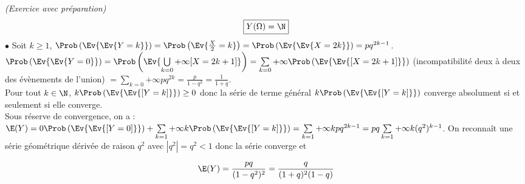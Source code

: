 \documentclass[11pt]{article}%
\begin{document}
\begin{exercice}{\it (Exercice avec préparation)}
\[
 \boxed{Y(\Omega) = \N}
\]
$\bullet$ Soit $k \geq 1$, $\Prob\left(\Ev{\Ev{Y = k}}\right) =
\Prob\left(\Ev{ \frac{X}{2} = k}\right) = \Prob\left(\Ev{\Ev{X =
      2k}}\right) = p q^{2k-1}$.\\
$\Prob\left(\Ev{\Ev{Y = 0}}\right) = \Prob\left(\Ev{ \bigcup
    \limits_{k = 0}{+ \infty} [X = 2k + 1]}\right) = \sum \limits_{k =
  0}{+ \infty} \Prob\left(\Ev{\Ev{[X = 2k + 1]}}\right) $
(incompatibilité deux à deux des évènements de l'union) $ = \sum
\limits_{k = 0}{+
  \infty}pq^{2k} = \frac{p}{1-q^{2}} = \frac{1}{1 + q}$. \\
Pour tout $k \in \N$, $k\Prob\left(\Ev{\Ev{[Y = k]}}\right) \geq 0$
donc la série de terme général $k \Prob\left(\Ev{\Ev{[Y = k]}}\right)$
converge absolument si et seulement si elle converge. \\
Sous réserve de convergence, on a : \\
$\E(Y) = 0 \Prob\left(\Ev{\Ev{ [Y = 0]}}\right) + \sum \limits_{k =
  1}{+ \infty} k \Prob\left(\Ev{\Ev{[Y = k]}}\right) = \sum \limits_{k
  = 1}{+ \infty} k pq^{2k-1} = pq \sum \limits_{k = 1}{+ \infty}
k(q^{2})^{k-1}$. On reconnaît une série géométrique dérivée de raison
$q^{2}$ avec $|q^{2}| = q^{2} <1$ donc la série converge et
 
\[
 \E(Y) = \frac{pq}{(1-q^{2})^{2}} = \frac{q}{(1 + q)^{2}(1-q)} 
\]
 \end{exercice}
\end{document}
